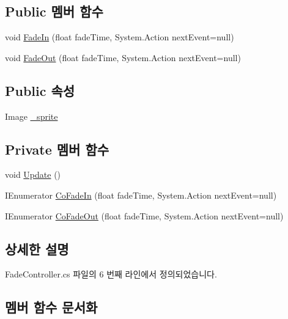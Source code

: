 \subsection*{Public 멤버 함수}
\begin{DoxyCompactItemize}
\item 
void \mbox{\hyperlink{class_fade_controller_a1548aeda608cc1dba1db3adaeff20430}{Fade\+In}} (float fade\+Time, System.\+Action next\+Event=null)
\item 
void \mbox{\hyperlink{class_fade_controller_a0f5a8752a7f7cefa8e81b845b21b3f4a}{Fade\+Out}} (float fade\+Time, System.\+Action next\+Event=null)
\end{DoxyCompactItemize}
\subsection*{Public 속성}
\begin{DoxyCompactItemize}
\item 
Image \mbox{\hyperlink{class_fade_controller_a8efb7f7bb8771b66806f30f4db5bd6d5}{\+\_\+sprite}}
\end{DoxyCompactItemize}
\subsection*{Private 멤버 함수}
\begin{DoxyCompactItemize}
\item 
void \mbox{\hyperlink{class_fade_controller_a0503954733cfa08c0442d9101c7c13a5}{Update}} ()
\item 
I\+Enumerator \mbox{\hyperlink{class_fade_controller_ae01cc471bb439aa20b036ec93e6371b6}{Co\+Fade\+In}} (float fade\+Time, System.\+Action next\+Event=null)
\item 
I\+Enumerator \mbox{\hyperlink{class_fade_controller_acb1828a03e8bb69d90e1b2db32135882}{Co\+Fade\+Out}} (float fade\+Time, System.\+Action next\+Event=null)
\end{DoxyCompactItemize}


\subsection{상세한 설명}


Fade\+Controller.\+cs 파일의 6 번째 라인에서 정의되었습니다.



\subsection{멤버 함수 문서화}
\mbox{\label{class_fade_controller_ae01cc471bb439aa20b036ec93e6371b6}} 
